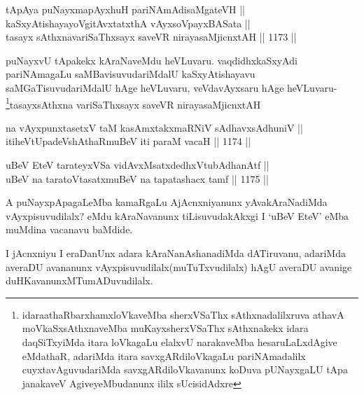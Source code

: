 \begin{shl}
tApAya puNayxmapAyxhuH pariNAmAdisaMgateVH || \\
kaSxyAtishayayoVgitAvxtatxthA vAyxsoV\s payxBASata || \\
tasayx sAthxnavariSaThxsayx saveVR nirayasaMjicnxtAH \hfill || 1173 ||  
\end{shl}	

\begin{artha}
puNayxvU tApakekx kAraNaveMdu heVLuvaru. vaqdidhxkaSxyAdi pariNAmagaLu saMBavisuvudariMdalU kaSxyAtishayavu saMGaTisuvudariMdalU hAge heVLuvaru, veVdavAyxsaru hAge heVLuvaru-\\
\footnote{idaraathaR\ndash  barxhamxloVkaveMba sherxVSaThx sAthxnadalilxruva athavA moVkaSxsAthxnaveMba muKayxsherxVSaThx sAthxnakekx idara daqSiTxyiMda itara loVkagaLu elalxvU narakaveMba hesaruLaLxdAgive eMdathaR, adariMda itara savxgARdiloVkagaLu pariNAmadalilx cuyxtavAguvudariMda savxgARdiloVkavanunx koDuva pUNayxgaLU tApa janakaveV AgiveyeMbudanunx ililx sUcisidAdxre}tasayxsAthxna variSaThxsayx saveVR nirayasaMjicnxtAH
\end{artha}




\begin{shl}
na vAyxpunxtasetxV taM kasAmxtakxmaRNiV sAdhavxsAdhuniV || \\
itiheVtUpadeVshAthaRmuBeV iti paraM vacaH \hfill || 1174 ||  
\end{shl}
				
\begin{shl}
uBeV EteV tarateyxVSa vidAvxMsatxdedhxVtubAdhanAtf || \\
uBeV na taratoV\s tasatxmuBeV na tapatashacx tamf \hfill || 1175 ||  
\end{shl}

\begin{artha}
A puNayxpApagaLeMba kamaRgaLu AjAcnxniyanunx yAvakAraNadiMda vAyxpisuvudilalx? eMdu 
kAraNavanunx tiLisuvudakAkxgi I `uBeV EteV' eMba muMdina vacanavu baMdide.
\end{artha}

\begin{artha}
I jAcnxniyu I eraDanUnx adara kAraNanAshanadiMda dATiruvanu, adariMda averaDU avananunx vAyxpisuvudilalx(muTuTxvudilalx) hAgU averaDU avanige duHKavanunxMTumADuvudilalx.
\end{artha}

